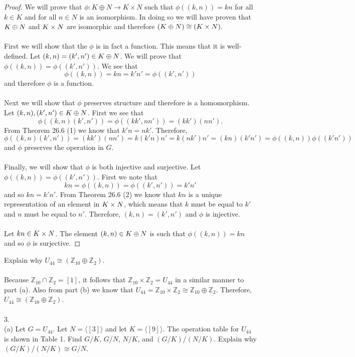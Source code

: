 \documentclass[11pt]{article}
\begin{document}
\begin{proof}
We will prove that $\phi: K \oplus N \rightarrow K \times N$ such that $\phi((k,n)) = kn$ for all $k\in K$ and for all $n\in N$ is an isomorphism. In doing so we will have proven that $K \oplus N$ and $K \times N$ are isomorphic and therefore $ (K \oplus N) \cong (K \times N) $.\\
~\\
First we will show that the $\phi$ is in fact a function. This means that it is well-defined. Let $(k,n) = (k',n') \in K \oplus N$. We will prove that $\phi((k,n)) = \phi((k',n'))$. We see that
\[ \phi((k,n)) = kn = k'n' = \phi((k',n')) \]
and therefore $\phi$ is a function.\\
~\\
Next we will show that $\phi$ preserves structure and therefore is a homomorphism. Let $(k,n),(k',n')\in K \oplus N$. First we see that 
\[ \phi((k,n)(k',n')) = \phi((kk',nn')) = (kk')(nn'). \]
From Theorem 26.6 (1) we know that $k'n=nk'$. Therefore,
\[ \phi((k,n)(k',n')) = (kk')(nn') = k(k'n)n' = k(nk')n' = (kn)(k'n') = \phi((k,n))\phi((k'n')) \]
and $\phi$ preserves the operation in $G$.\\
~\\
Finally, we will show that $\phi$ is both injective and surjective. Let $\phi((k,n)) = \phi((k',n'))$. First we note that
\[ kn = \phi((k,n)) = \phi((k',n')) = k'n' \]
and so $kn=k'n'$. From Theorem 26.6 (2) we know that $kn$ is a unique representation of an element in $K \times N$, which means that $k$ must be equal to $k'$ and $n$ must be equal to $n'$. Therefore, $(k,n) = (k',n')$ and $\phi$ is injective.\\
~\\
Let $kn\in K \times N$. The element $(k,n)\in K \oplus N$ is such that $\phi((k,n))=kn$ and so $\phi$ is surjective.
\end{proof}
\newpage
Explain why $U_{44} \cong (\mathbb{Z}_{10} \oplus \mathbb{Z}_2)$.\\
~\\
Because $\mathbb{Z}_{10} \cap \mathbb{Z}_2 = [1]$, it follows that
 $\mathbb{Z}_{10} \times \mathbb{Z}_2 = U_{44}$ in a similar manner to part (a). Also from part (b) we know that $U_{44} = \mathbb{Z}_{10} \times \mathbb{Z}_2 \cong \mathbb{Z}_{10} \oplus \mathbb{Z}_2$. 
Therefore, $U_{44} \cong (\mathbb{Z}_{10} \oplus \mathbb{Z}_2)$.\\
~\\
3.\\
(a) Let $G= U_{44}$. Let $N = \langle [3] \rangle$ and let $K=\langle [9] \rangle$. The operation table for $U_{44}$ is shown in Table 1. Find $G/K$, $G/N$, $N/K$, and $(G/K)/(N/K)$. Explain why $(G/K)/(N/K) \cong G/N$.
\end{document}
